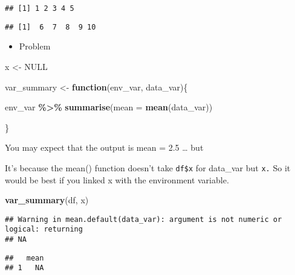 \documentclass[
]{book}
\newenvironment{Shaded}{\begin{snugshade}}{\end{snugshade}}
\newcommand{\ControlFlowTok}[1]{\textcolor[rgb]{0.13,0.29,0.53}{\textbf{#1}}}
\newcommand{\DataTypeTok}[1]{\textcolor[rgb]{0.13,0.29,0.53}{#1}}
\newcommand{\KeywordTok}[1]{\textcolor[rgb]{0.13,0.29,0.53}{\textbf{#1}}}
\newcommand{\NormalTok}[1]{#1}
\newcommand{\OperatorTok}[1]{\textcolor[rgb]{0.81,0.36,0.00}{\textbf{#1}}}
\newcommand{\OtherTok}[1]{\textcolor[rgb]{0.56,0.35,0.01}{#1}}
\newcommand{\StringTok}[1]{\textcolor[rgb]{0.31,0.60,0.02}{#1}}
\providecommand{\tightlist}{%
  \setlength{\itemsep}{0pt}\setlength{\parskip}{0pt}}
\begin{document}
\begin{verbatim}
## [1] 1 2 3 4 5
\end{verbatim}

\begin{Shaded}
\end{Shaded}

\begin{verbatim}
## [1]  6  7  8  9 10
\end{verbatim}

\begin{itemize}
\tightlist
\item
  Problem
\end{itemize}

\begin{Shaded}
\begin{Highlighting}[]
\NormalTok{x \textless{}{-}}\StringTok{ }\OtherTok{NULL} 

\NormalTok{var\_summary \textless{}{-}}\StringTok{ }\ControlFlowTok{function}\NormalTok{(env\_var, data\_var)\{}
 
\NormalTok{   env\_var }\OperatorTok{\%\textgreater{}\%}
\StringTok{    }\KeywordTok{summarise}\NormalTok{(}\DataTypeTok{mean =} \KeywordTok{mean}\NormalTok{(data\_var))}

\NormalTok{\}}
\end{Highlighting}
\end{Shaded}

You may expect that the output is mean = 2.5 \ldots{} but

It's because the mean() function doesn't take \texttt{df\$x} for data\_var but \texttt{x.} So it would be best if you linked x with the environment variable.

\begin{Shaded}
\begin{Highlighting}[]
\KeywordTok{var\_summary}\NormalTok{(df, x)}
\end{Highlighting}
\end{Shaded}

\begin{verbatim}
## Warning in mean.default(data_var): argument is not numeric or logical: returning
## NA
\end{verbatim}

\begin{verbatim}
##   mean
## 1   NA
\end{verbatim}
\end{document}
